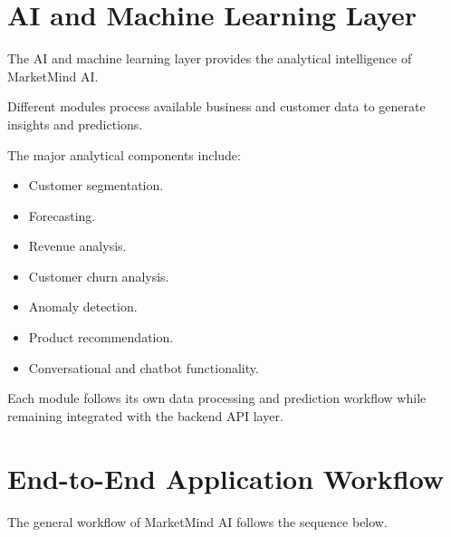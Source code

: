 \documentclass[12pt,a4paper]{report}
\begin{document}
\section{AI and Machine Learning Layer}

The AI and machine learning layer provides the analytical intelligence of
MarketMind AI.

Different modules process available business and customer data to generate
insights and predictions.

The major analytical components include:

\begin{itemize}[leftmargin=1.2cm]

\item Customer segmentation.

\item Forecasting.

\item Revenue analysis.

\item Customer churn analysis.

\item Anomaly detection.

\item Product recommendation.

\item Conversational and chatbot functionality.

\end{itemize}

Each module follows its own data processing and prediction workflow while
remaining integrated with the backend API layer.



\section{End-to-End Application Workflow}

The general workflow of MarketMind AI follows the sequence below.
\end{document}
